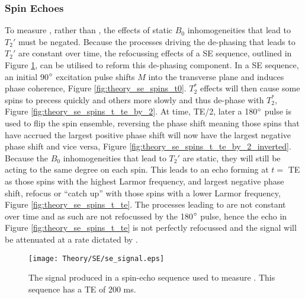 \subsubsection{Spin Echoes}
To measure \ttwo, rather than \ttwostar, the effects of static $B_0$ inhomogeneities that lead to $T_2'$ must be negated. Because the processes driving the de-phasing that leads to $T_2'$ are constant over time, the refocussing effects of a \ac{SE} sequence, outlined in Figure \ref{fig:theory_se_signal}, can be utilised to reform this de-phasing component. In a \ac{SE} sequence, an initial 90$\degree$ excitation pulse shifts $M$ into the transverse plane and induces phase coherence, Figure \ref{fig:theory_se_spins_t0}. $T_2^*$ effects will then cause some spins to precess quickly and others more slowly and thus de-phase with $T_2^*$, Figure \ref{fig:theory_se_spins_t_te_by_2}. At time, \ac{TE}/2, later a 180$\degree$ pulse is used to flip the spin ensemble, reversing the phase shift meaning those spins that have accrued the largest positive phase shift will now have the largest negative phase shift and vice versa, Figure \ref{fig:theory_se_spins_t_te_by_2_inverted}. Because the $B_0$ inhomogeneities that lead to $T_2'$ are static, they will still be acting to the same degree on each spin. This leads to an echo forming at $t =$ \ac{TE} as those spins with the highest Larmor frequency, and largest negative phase shift, refocus or ``catch up'' with those spins with a lower Larmor frequency, Figure \ref{fig:theory_se_spins_t_te}. The processes leading to \ttwo are not constant over time and as such are not refocussed by the 180$\degree$ pulse, hence the echo in Figure \ref{fig:theory_se_spins_t_te} is not perfectly refocussed and the signal will be attenuated at a rate dictated by \ttwo.

\begin{figure}[H]
	\centering
	\texttt{[image: Theory/SE/se\_signal.eps]}
	\caption{The signal produced in a spin-echo sequence used to measure \ttwo. This sequence has a \ac{TE} of 200 ms.}
	\label{fig:theory_se_signal}	
\end{figure}

